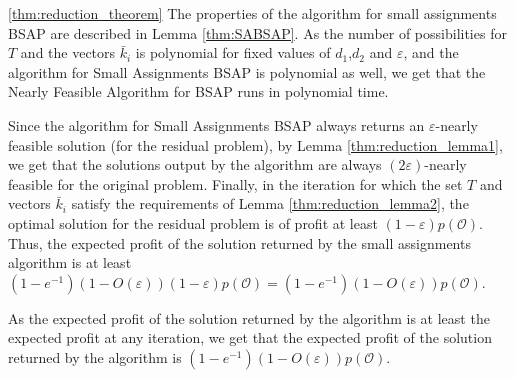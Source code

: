 \documentclass[11pt]{article}
\newcommand{\eps}{\varepsilon}
\newcommand{\bk}{\bar{k}}
\newcommand{\mO}{\mathcal{O}}
\newenvironment{dl_proof}[1]{\noindent{\bf Proof of Lemma #1:}}{
 \hspace*{\fill} $\Box$ \vskip \belowdisplayskip}
\begin{document}
{\begin{dl_proof}{\ref{thm:reduction_theorem}}
The properties of the algorithm for small assignments BSAP are
described in Lemma \ref{thm:SABSAP}. As the number of
possibilities for $T$ and the vectors $\bk_i$ is polynomial for
fixed values of $d_1$,$d_2$ and $\eps$, and the algorithm for
Small Assignments BSAP is polynomial as well, we get that the
Nearly Feasible Algorithm  for BSAP runs in polynomial time.

Since the algorithm for Small Assignments BSAP always returns an
 $\eps$-nearly feasible solution
(for the residual problem),
by Lemma \ref{thm:reduction_lemma1}, we get that the solutions output
 by the algorithm
are always $(2\eps)$-nearly feasible for the original problem.
Finally, in the iteration for which the set $T$ and vectors $\bk_i$ satisfy the
requirements of Lemma \ref{thm:reduction_lemma2}, the optimal solution for the
residual problem is of profit at least $(1-\eps)p(\mO)$.
Thus, the expected profit of the solution returned by the small assignments algorithm is
at least $(1-e^{-1})(1-O(\eps))(1-\eps)p(\mO)=(1-e^{-1})(1-O(\eps))p(\mO)$.

As the expected profit of the solution returned  by the algorithm is at least the
expected profit at any iteration, we get that the expected profit
of the solution returned by the algorithm is $(1-e^{-1})(1-O(\eps))p(\mO)$.
\end{dl_proof}
}
\end{document}
